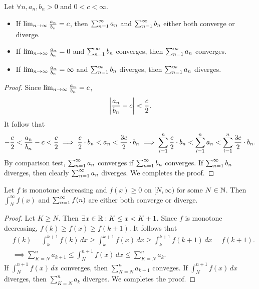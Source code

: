 \begin{theorem}
  Let $\forall n, a_n, b_n > 0$ and $0 < c < \infty$.
  \begin{itemize}
    \item If $\lim_{n \to \infty} \frac{a_n}{b_n} = c$, then $\sum_{n=1}^{\infty} a_n$ and $\sum_{n=1}^{\infty} b_n$ either
          both converge or diverge.
    \item If $\lim_{n \to \infty} \frac{a_n}{b_n} = 0$ and $\sum_{n=1}^{\infty} b_n$ converges, then $\sum_{n=1}^{\infty}
            a_n$ converges.
    \item If $\lim_{n \to \infty} \frac{a_n}{b_n} = \infty$ and $\sum_{n=1}^{\infty} b_n$ diverges, then
          $\sum_{n=1}^{\infty} a_n$ diverges.
  \end{itemize}
  \label{thm:ser_test_lim}
\end{theorem}
\begin{proof}
  Since $\lim_{n \to \infty} \frac{a_n}{b_n} = c$,
  \begin{equation}
    \left| \frac{a_n}{b_n} - c \right| < \frac{c}{2}.
  \end{equation}
  It follow that
  \begin{equation}
    -\frac{c}{2} < \frac{a_n}{b_n} - c < \frac{c}{2}
    \implies \frac{c}{2} \cdot b_n < a_n < \frac{3c}{2} \cdot b_n
    \implies \sum_{i = 1}^{n} \frac{c}{2} \cdot b_n < \sum_{i = 1}^{n} a_n < \sum_{i = 1}^{n} \frac{3c}{2} \cdot b_n.
  \end{equation}
  By comparison test, $\sum_{n=1}^{\infty} a_n$ converges if $\sum_{n=1}^{\infty} b_n$ converges. If $\sum_{n=1}^{\infty}
    b_n$ diverges, then clearly $\sum_{n=1}^{\infty} a_n$ diverges. We completes the proof.
\end{proof}

\begin{theorem}
  Let $f$ is monotone decreasing and $f(x) \ge 0$ on $[N, \infty)$ for some $N
    \in \mathbb{N}$. Then $\int_N^{\infty} f(x)$ and $\sum_{n=1}^{\infty} f(n)$ are either both converge
  or diverge.
  \label{thm:ser_test_int}
\end{theorem}
\begin{proof}
  Let $K \ge N$. Then $\exists x \in \mathbb{R}: K \le x < K + 1$. Since $f$ is
  monotone decreasing, $f(k) \ge f(x) \ge f(k+1)$. It follows that
  \begin{equation}
    \begin{split}
      &f(k) = \int_k^{k+1} f(k)\,dx \ge \int_k^{k+1}f(x)\,dx \ge \int_k^{k+1}f(k+1)\,dx = f(k+1).  \\
      &\implies \sum_{K=N}^n a_{k+1} \le \int_{N}^{n+1} f(x)\,dx \le \sum_{K=N}^n a_{k}.
    \end{split}
  \end{equation}
  If $\int_{N}^{n+1} f(x)\,dx$ converges, then $\sum_{K=N}^n a_{k+1}$ conveges.
  If $\int_{N}^{n+1} f(x)\,dx$ diverges, then $\sum_{K=N}^n a_{k}$ diverges. We
  completes the proof.
\end{proof}

